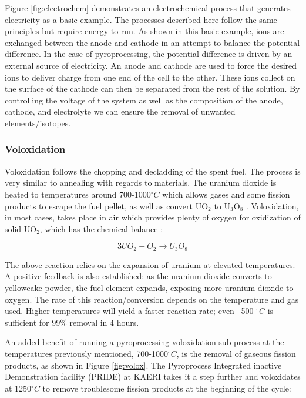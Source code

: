 Figure \ref{fig:electrochem} demonstrates an electrochemical process that generates electricity as a basic example.
The processes described here follow the same principles but require energy to run.
As shown in this basic example, ions are exchanged between the anode and cathode in an attempt to balance the potential difference.
In the case of pyroprocessing, the potential difference is driven by an external source of electricity.
An anode and cathode are used to force the desired ions to deliver charge from one end of the cell to the other.
These ions collect on the surface of the cathode can then be separated from the rest of the solution.
By controlling the voltage of the system as well as the composition of the anode, cathode, and electrolyte we can ensure the removal of unwanted elements/isotopes.


\subsubsection{Voloxidation}
Voloxidation follows the chopping and decladding of the spent fuel. The process is very similar to annealing with regards to materials. The uranium dioxide is heated to temperatures around 700-1000$^\circ C$ which allows gases and some fission products to escape the fuel pellet, as well as convert UO$_2$ to U$_3$O$_8$ \cite{organisation}. Voloxidation, in most cases, takes place in air which provides plenty of oxygen for oxidization of solid UO$_2$, which has the chemical balance \cite{jubin_spent_2009}:

\[ 3UO_2 + O_2 \rightarrow U_3O_8 \]

The above reaction relies on the expansion of uranium at elevated temperatures. A positive feedback is also established: as the uranium dioxide converts to yellowcake powder, the fuel element expands, exposing more uranium dioxide to oxygen. The rate of this reaction/conversion depends on the temperature and gas used. Higher temperatures will yield a faster reaction rate; even ~500 $^\circ C$ is sufficient for 99\% removal in 4 hours.

An added benefit of running a pyroprocessing voloxidation sub-process at the temperatures previously mentioned, 700-1000$^\circ C$, is the removal of gaseous fission products, as shown in Figure \ref{fig:volox}. The
Pyroprocess Integrated inactive Demonstration facility (PRIDE) at KAERI takes it a step further and voloxidates at 1250$^\circ C$ to remove troublesome fission products at the beginning of the cycle\cite{organisation}:


